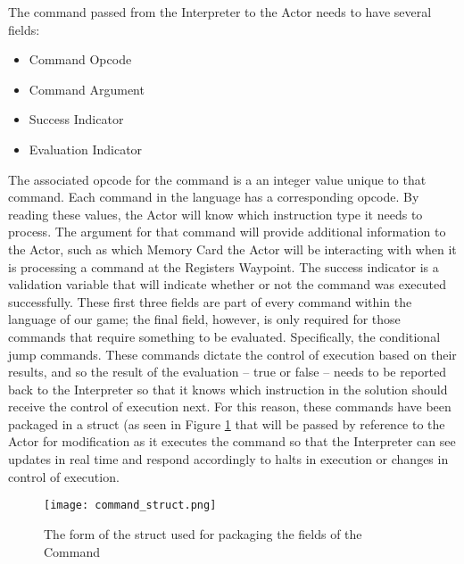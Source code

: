 The command passed from the Interpreter to the Actor needs to have several fields:
\begin{itemize}
	\item Command Opcode
	\item Command Argument
	\item Success Indicator
	\item Evaluation Indicator
\end{itemize}
The associated opcode for the command is a an integer value unique to that command. Each command in the language has a corresponding opcode. By reading these values, the Actor will know which instruction type it needs to process. The argument for that command will provide additional information to the Actor, such as which Memory Card the Actor will be interacting with when it is processing a command at the Registers Waypoint. The success indicator is a validation variable that will indicate whether or not the command was executed successfully. These first three fields are part of every command within the language of our game; the final field, however, is only required for those commands that require something to be evaluated. Specifically, the conditional jump commands. These commands dictate the control of execution based on their results, and so the result of the evaluation -- true or false -- needs to be reported back to the Interpreter so that it knows which instruction in the solution should receive the control of execution next. For this reason, these commands have been packaged in a struct (as seen in Figure \ref{fig:command_struct} that will be passed by reference to the Actor for modification as it executes the command so that the Interpreter can see updates in real time and respond accordingly to halts in execution or changes in control of execution.\\


\begin{figure}[!htb]
  \caption{The form of the struct used for packaging the fields of the Command}
  \label{fig:command_struct}
  \centering
  \texttt{[image: command\_struct.png]}
\end{figure}

